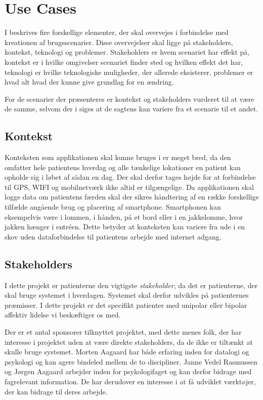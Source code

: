 \section{Use Cases}
I \citet[Afsnit 13.3, s83, nederst]{art:essence} beskrives fire forskellige elementer, der skal overvejes i forbindelse med kreationen af brugsscenarier.
Disse overvejelser skal ligge på stakeholders, kontekst, teknologi og problemer.
Stakeholders er hvem scenariet har effekt på, kontekst er i hvilke omgivelser scenariet finder sted og hvilken effekt det har, teknologi er hvilke teknologiske muligheder, der allerede eksisterer, problemer er hvad alt hvad der kunne give grundlag for en ændring.

For de scenarier der præsenteres er kontekst og stakeholders vurderet til at være de samme, selvom der i \citet[Afsnit 13.3, s83, nederst]{art:essence} siges at de sagtens kan variere fra et scenarie til et andet.

\subsection{Kontekst}
Konteksten som applikationen skal kunne bruges i er meget bred, da den omfatter hele patientens hverdag og alle tænkelige lokationer en patient kan opholde sig i løbet af sådan en dag.
Der skal derfor tages højde for at forbindelse til GPS, WIFI og mobilnetværk ikke altid er tilgængelige.
Da applikationen skal logge data om patientens færden skal der sikres håndtering af en række forskellige tilfælde angående brug og placering af smartphone.
Smartphonen kan eksempelvis være i lommen, i hånden, på et bord eller i en jakkelomme, hvor jakken hænger i entréen.
Dette betyder at konteksten kan variere fra ude i en skov uden dataforbindelse til patientens arbejde med internet adgang.

\subsection{Stakeholders}
I dette projekt er patienterne den vigtigste \textit{stakeholder}, da det er patienterne, der skal bruge systemet i hverdagen.
Systemet skal derfor udvikles på patienternes præmisser.
I dette projekt er det specifikt patienter med unipolar eller bipolar affektiv lidelse vi beskæftiger os med.

Der er et antal sponsorer tilknyttet projektet, med dette menes folk, der har interesse i projektet uden at være direkte stakeholders, da de ikke er tiltænkt at skulle bruge systemet.
Morten Aagaard har både erfaring inden for datalogi og psykologi og kan agere bindeled mellem de to discipliner.
Janne Vedel Rasmussen og Jørgen Aagaard arbejder inden for psykologifaget og kan derfor bidrage med fagrelevant information.
De har derudover en interesse i at få udviklet værktøjer, der kan bidrage til deres arbejde.

